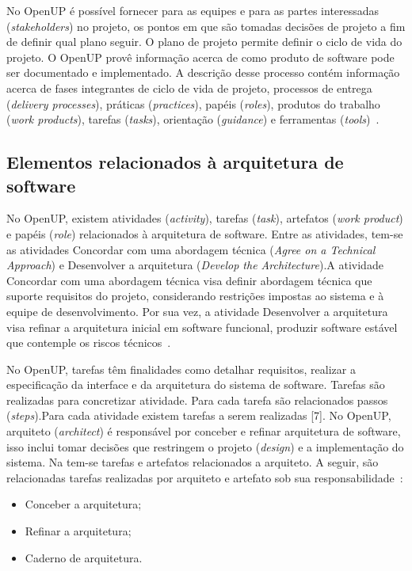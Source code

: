 No OpenUP é possível fornecer para as equipes e para as partes interessadas (\emph{stakeholders}) no projeto, os pontos em que são tomadas decisões de projeto a fim de definir qual plano seguir. O plano de projeto permite definir o ciclo de vida do projeto. O OpenUP provê informação acerca de como produto de software pode ser documentado e implementado. A descrição desse processo contém informação acerca de fases integrantes de ciclo de vida de projeto, processos de entrega (\emph{delivery processes}), práticas (\emph{practices}), papéis (\emph{roles}), produtos do trabalho (\emph{work products}), tarefas (\emph{tasks}), orientação (\emph{guidance}) e ferramentas (\emph{tools})~\cite{openup}.

\subsection{Elementos relacionados à arquitetura de software}
\label{sec:5.1.1}

No OpenUP, existem atividades (\emph{activity}), tarefas (\emph{task}), artefatos (\emph{work product}) e papéis (\emph{role}) relacionados à arquitetura de software. Entre as atividades, tem-se as atividades Concordar com uma abordagem técnica (\emph{Agree on a Technical Approach}) e Desenvolver a arquitetura (\emph{Develop the Architecture}).A atividade Concordar com uma abordagem técnica visa definir abordagem técnica que suporte requisitos do projeto, considerando restrições impostas ao sistema e à equipe de desenvolvimento. Por sua vez, a atividade Desenvolver a arquitetura visa refinar a arquitetura inicial em software funcional, produzir software estável que contemple os riscos técnicos~\cite{openup}.

No OpenUP, tarefas têm finalidades como detalhar requisitos, realizar a especificação da interface e da arquitetura do sistema de software. Tarefas são realizadas para concretizar atividade. Para cada tarefa são relacionados passos (\emph{steps}).Para cada atividade existem tarefas a serem realizadas [7]. No OpenUP, arquiteto (\emph{architect}) é responsável por conceber e refinar arquitetura de software, isso inclui tomar decisões que restringem o projeto (\emph{design}) e a implementação do sistema. Na  tem-se tarefas e artefatos relacionados a arquiteto. A seguir, são relacionadas tarefas realizadas por arquiteto e artefato sob sua responsabilidade~\cite{openup}: 

\begin{itemize}
    \item Conceber a arquitetura;
    \item Refinar a arquitetura;
    \item Caderno de arquitetura.
\end{itemize} 


